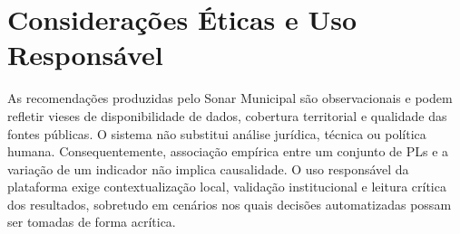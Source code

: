 \section{Considerações Éticas e Uso Responsável}

As recomendações produzidas pelo Sonar Municipal são observacionais e podem refletir vieses de disponibilidade de dados, cobertura territorial e qualidade das fontes públicas. O sistema não substitui análise jurídica, técnica ou política humana. Consequentemente, associação empírica entre um conjunto de PLs e a variação de um indicador não implica causalidade. O uso responsável da plataforma exige contextualização local, validação institucional e leitura crítica dos resultados, sobretudo em cenários nos quais decisões automatizadas possam ser tomadas de forma acrítica.
